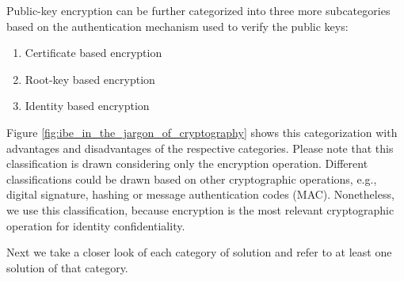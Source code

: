 \documentclass[conference]{IEEEtran}
\begin{document}
Public-key encryption can be further categorized into three more subcategories based on the authentication mechanism used to verify the public keys:
\begin{enumerate}
\item Certificate based encryption
\item Root-key based encryption
\item Identity based encryption
\end{enumerate} 
Figure \ref{fig:ibe_in_the_jargon_of_cryptography} shows this categorization with advantages and disadvantages of the respective categories. Please note that this classification is drawn considering only the encryption operation. Different classifications could be drawn based on other cryptographic operations, e.g., digital signature, hashing or message authentication codes (MAC). Nonetheless, we use this classification, because encryption is the most relevant cryptographic operation for identity confidentiality. 


Next we take a closer look of each category of solution and refer to at least one solution of that category.
\end{document}
